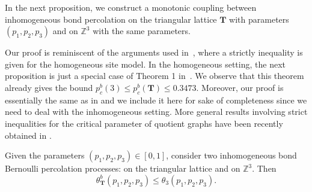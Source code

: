 \documentclass{aptpub}
\newcommand{\Z}{\mathbb{Z}}
\begin{document}
In the next proposition, we construct a monotonic coupling between inhomogeneous bond percolation on the  triangular lattice $\mathbf{T}$ with parameters $(p_1,p_2,p_3)$ and on $\Z^3$ with the same parameters.

Our proof is reminiscent of the  arguments used in~\cite{CR}, where a strictly inequality is given for the homogeneous site model. In the homogeneous setting, the next proposition is just a special case of Theorem 1 in~\cite{BS}. We observe that this theorem already gives the bound $p^b_c(3)\leq p^b_c(\mathbf{T})\leq 0.3473 $. Moreover, our proof is essentially the same as in \cite{BS} and we include it here for sake of completeness since we need to deal with the inhomogeneous setting. More general results involving strict inequalities for the critical parameter of quotient graphs have been recently obtained in \cite{MS}.



\begin{prop}\label{prop:triangular}
Given the parameters $(p_1,p_2,p_3)\in [0,1]$, consider two inhomogeneous bond Bernoulli percolation processes: on the triangular lattice  and on $\Z^3$. Then
\[\theta^b_{\mathbf{T}}(p_1,p_2,p_3)\leq\theta_3(p_1,p_2,p_3).\]
\end{prop}
\end{document}
